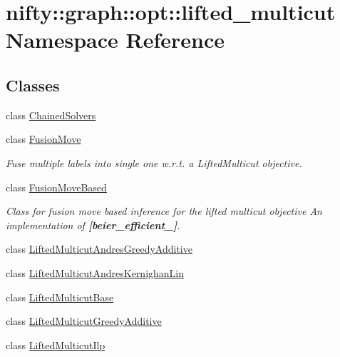 \hypertarget{namespacenifty_1_1graph_1_1opt_1_1lifted__multicut}{}\section{nifty\+:\+:graph\+:\+:opt\+:\+:lifted\+\_\+multicut Namespace Reference}
\label{namespacenifty_1_1graph_1_1opt_1_1lifted__multicut}
\subsection*{Classes}
\begin{DoxyCompactItemize}
\item 
class \hyperlink{classnifty_1_1graph_1_1opt_1_1lifted__multicut_1_1ChainedSolvers}{Chained\+Solvers}
\item 
class \hyperlink{classnifty_1_1graph_1_1opt_1_1lifted__multicut_1_1FusionMove}{Fusion\+Move}
\begin{DoxyCompactList}\small\item\em Fuse multiple labels into single one w.\+r.\+t. a Lifted\+Multicut objective. \end{DoxyCompactList}\item 
class \hyperlink{classnifty_1_1graph_1_1opt_1_1lifted__multicut_1_1FusionMoveBased}{Fusion\+Move\+Based}
\begin{DoxyCompactList}\small\item\em Class for fusion move based inference for the lifted multicut objective An implementation of {\bfseries [beier\+\_\+efficient\+\_]}. \end{DoxyCompactList}\item 
class \hyperlink{classnifty_1_1graph_1_1opt_1_1lifted__multicut_1_1LiftedMulticutAndresGreedyAdditive}{Lifted\+Multicut\+Andres\+Greedy\+Additive}
\item 
class \hyperlink{classnifty_1_1graph_1_1opt_1_1lifted__multicut_1_1LiftedMulticutAndresKernighanLin}{Lifted\+Multicut\+Andres\+Kernighan\+Lin}
\item 
class \hyperlink{classnifty_1_1graph_1_1opt_1_1lifted__multicut_1_1LiftedMulticutBase}{Lifted\+Multicut\+Base}
\item 
class \hyperlink{classnifty_1_1graph_1_1opt_1_1lifted__multicut_1_1LiftedMulticutGreedyAdditive}{Lifted\+Multicut\+Greedy\+Additive}
\item 
class \hyperlink{classnifty_1_1graph_1_1opt_1_1lifted__multicut_1_1LiftedMulticutIlp}{Lifted\+Multicut\+Ilp}

\end{DoxyCompactItemize}
